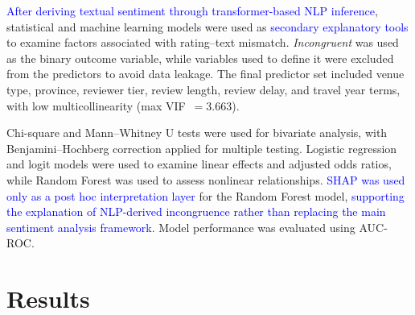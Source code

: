 \documentclass[conference]{IEEEtran}
\newcommand{\changed}[1]{\textcolor{blue}{#1}}
\begin{document}
\changed{After deriving textual sentiment through transformer-based NLP inference}, statistical and machine learning models were used as \changed{secondary explanatory tools} to examine factors associated with rating--text mismatch. \textit{Incongruent} was used as the binary outcome variable, while variables used to define it were excluded from the predictors to avoid data leakage. The final predictor set included venue type, province, reviewer tier, review length, review delay, and travel year terms, with low multicollinearity (max VIF~$= 3.663$).

Chi-square and Mann--Whitney U tests were used for bivariate analysis, with Benjamini--Hochberg correction applied for multiple testing. Logistic regression and logit models were used to examine linear effects and adjusted odds ratios, while Random Forest was used to assess nonlinear relationships. \changed{SHAP was used only as a post hoc interpretation layer} for the Random Forest model, \changed{supporting the explanation of NLP-derived incongruence rather than replacing the main sentiment analysis framework}. Model performance was evaluated using AUC-ROC.

\begin{table}[htbp]
\caption{Modeling and Interpretation Framework}
\label{tab:model_framework}
\centering
{}
\end{table}

 

\section{Results}
\end{document}
